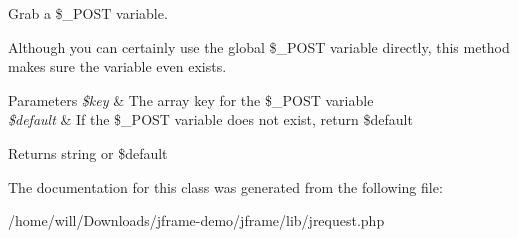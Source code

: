 Grab a \$\-\_\-\-P\-O\-S\-T variable. 

Although you can certainly use the global \$\-\_\-\-P\-O\-S\-T variable directly, this method makes sure the variable even exists. 
\begin{DoxyParams}{Parameters}
{\em \$key} & The array key for the \$\-\_\-\-P\-O\-S\-T variable \\
\hline
{\em \$default} & If the \$\-\_\-\-P\-O\-S\-T variable does not exist, return \$default \\
\hline
\end{DoxyParams}
\begin{DoxyReturn}{Returns}
string or \$default 
\end{DoxyReturn}


The documentation for this class was generated from the following file\-:\begin{DoxyCompactItemize}
\item 
/home/will/\-Downloads/jframe-\/demo/jframe/lib/jrequest.\-php\end{DoxyCompactItemize}
